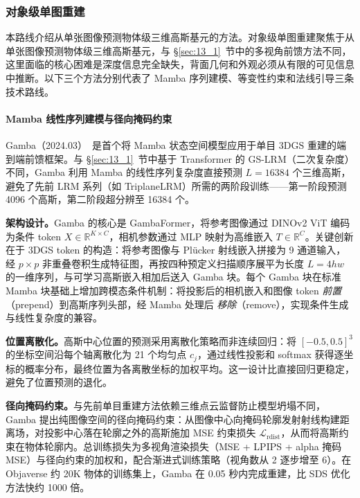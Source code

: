\subsubsection{对象级单图重建}

本路线介绍从单张图像预测物体级三维高斯基元的方法。对象级单图重建聚焦于从单张图像预测物体级三维高斯基元，与 §\ref{sec:13_1}~节中的多视角前馈方法不同，这里面临的核心困难是深度信息完全缺失，背面几何和外观必须从有限的可见信息中推断。以下三个方法分别代表了 Mamba 序列建模、等变性约束和法线引导三条技术路线。

\paragraph{Mamba 线性序列建模与径向掩码约束}

Gamba（2024.03）~\cite{2403_18795}是首个将 Mamba 状态空间模型应用于单目 3DGS 重建的端到端前馈框架。与 §\ref{sec:13_1}~节中基于 Transformer 的 GS-LRM（二次复杂度）不同，Gamba 利用 Mamba 的线性序列复杂度直接预测 $L{=}16384$ 个三维高斯，避免了先前 LRM 系列（如 TriplaneLRM）所需的两阶段训练——第一阶段预测 4096 个高斯，第二阶段超分辨至 16384 个。

\textbf{架构设计。}Gamba 的核心是 GambaFormer，将参考图像通过 DINOv2 ViT 编码为条件 token $X \in \mathbb{R}^{K \times C}$，相机参数通过 MLP 映射为高维嵌入 $T \in \mathbb{R}^C$。关键创新在于 3DGS token 的构造：将参考图像与 Pl\"ucker 射线嵌入拼接为 9 通道输入，经 $p \times p$ 非重叠卷积生成特征图，再按四种预定义扫描顺序展平为长度 $L = 4hw$ 的一维序列，与可学习高斯嵌入相加后送入 Gamba 块。每个 Gamba 块在标准 Mamba 块基础上增加跨模态条件机制：将投影后的相机嵌入和图像 token \emph{前置}（prepend）到高斯序列头部，经 Mamba 处理后 \emph{移除}（remove），实现条件生成与线性复杂度的兼容。

\textbf{位置离散化。}高斯中心位置的预测采用离散化策略而非连续回归：将 $[-0.5, 0.5]^3$ 的坐标空间沿每个轴离散化为 21 个均匀点 $c_j$，通过线性投影和 softmax 获得逐坐标的概率分布，最终位置为各离散坐标的加权平均。这一设计比直接回归更稳定，避免了位置预测的退化。

\textbf{径向掩码约束。}与先前单目重建方法依赖三维点云监督防止模型坍塌不同，Gamba 提出纯图像空间的径向掩码约束：从图像中心向掩码轮廓发射射线构建距离场，对投影中心落在轮廓之外的高斯施加 MSE 约束损失 $\mathcal{L}_{\text{rdist}}$，从而将高斯约束在物体轮廓内。总训练损失为多视角渲染损失（MSE + LPIPS + alpha 掩码 MSE）与径向约束的加权和，配合渐进式训练策略（视角数从 2 逐步增至 6）。在 Objaverse 约 20K 物体的训练集上，Gamba 在 0.05 秒内完成重建，比 SDS 优化方法快约 1000 倍。

